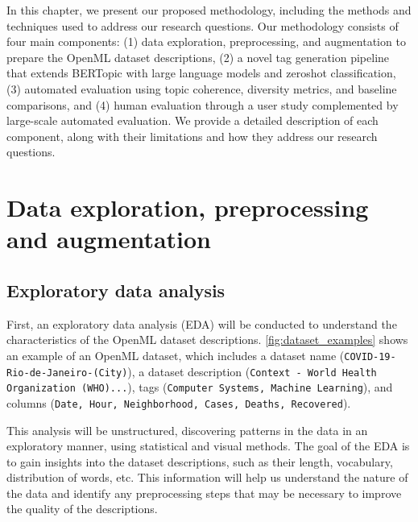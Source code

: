 \label{sec:methodology}
In this chapter, we present our proposed methodology, including the methods and techniques used to address our research questions. Our methodology consists of four main components: (1) data exploration, preprocessing, and augmentation to prepare the OpenML dataset descriptions, (2) a novel tag generation pipeline that extends BERTopic with large language models and zeroshot classification, (3) automated evaluation using topic coherence, diversity metrics, and baseline comparisons, and (4) human evaluation through a user study complemented by large-scale automated evaluation. We provide a detailed description of each component, along with their limitations and how they address our research questions.

\section{Data exploration, preprocessing and augmentation}
\label{sec:data_exploration}
\subsection{Exploratory data analysis}
First, an exploratory data analysis (EDA) will be conducted to understand the characteristics of the OpenML dataset descriptions. \cref{fig:dataset_examples} shows an example of an OpenML dataset, which includes a dataset name (\texttt{COVID-19-Rio-de-Janeiro-(City)}), a dataset description (\texttt{Context - World Health Organization (WHO)...}), tags (\texttt{Computer Systems, Machine Learning}), and columns (\texttt{Date, Hour, Neighborhood, Cases, Deaths, Recovered}).

This analysis will be unstructured, discovering patterns in the data in an exploratory manner, using statistical and visual methods. The goal of the EDA is to gain insights into the dataset descriptions, such as their length, vocabulary, distribution of words, etc. This information will help us understand the nature of the data and identify any preprocessing steps that may be necessary to improve the quality of the descriptions.


